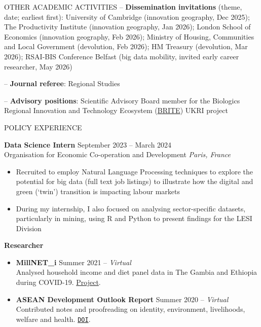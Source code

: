 \documentclass{resume}
\begin{document}
\begin{rSection}{OTHER ACADEMIC ACTIVITIES}
-- \textbf{Dissemination invitations} (theme, date; earliest first): University of Cambridge (innovation geography, Dec 2025); The Productivity Institute (innovation geography, Jan 2026); London School of Economics (innovation geography, Feb 2026); Ministry of Housing, Communities and Local Government (devolution, Feb 2026); HM Treasury (devolution, Mar 2026); RSAI-BIS Conference Belfast (big data mobility, invited early career researcher, May 2026)

-- \textbf{Journal referee}: Regional Studies

-- \textbf{Advisory positions}: Scientific Advisory Board member for the Biologics Regional Innovation and Technology Ecosystem (\href{https://briteprogramme.co.uk/}{BRITE}) UKRI project 

\end{rSection}

\begin{rSection}{POLICY EXPERIENCE}

\textbf{Data Science Intern} \hfill September 2023 -- March 2024 \\
Organisation for Economic Co-operation and Development \hfill \textit{Paris, France}
\vspace{-0.5em}
 \begin{itemize}
    \itemsep -3pt {} 
     \item Recruited to employ Natural Language Processing techniques to explore the potential for big data (full text job listings) to illustrate how the digital and green (`twin') transition is impacting labour markets
      \item During my internship, I also focused on analysing sector-specific datasets, particularly in mining, using R and Python to present findings for the LESI Division
 \end{itemize}

\textbf{Researcher} \hfill \\
\vspace{-1.35em}
 \begin{itemize}
    \itemsep -3pt {} 
     \item \textbf{MillNET\_i} \hfill Summer 2021 -- \textit{Virtual}\\
     Analysed household income and diet panel data in The Gambia and Ethiopia during COVID-19. \href{https://www.globalfood.cam.ac.uk/keyprogs/millneti}{Project}.
     \item \textbf{ASEAN Development Outlook Report} \hfill Summer 2020 -- \textit{Virtual}\\
     Contributed notes and proofreading on identity, environment, livelihoods, welfare and health. \href{https://www.asean.org/wp-content/uploads/2021/07/ASEAN-Development-Outlook-ADO_FINAL.pdf}{\nolinkurl{DOI}}.
 \end{itemize}
\end{rSection}
\end{document}
